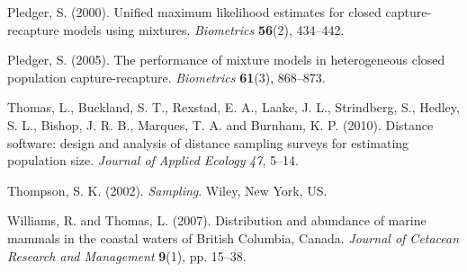 \documentclass[useAMS,referee]{biom}
\begin{document}
\begin{thebibliography}{}
\bibitem{ } Pledger, S. (2000). Unified maximum likelihood estimates for closed capture-recapture models using mixtures. \textit{Biometrics} \textbf{56}(2), 434--442. 

\bibitem{ } Pledger, S. (2005). The performance of mixture models in heterogeneous closed population capture-recapture. \textit{Biometrics} \textbf{61}(3), 868--873.

\bibitem{ } Thomas, L., Buckland, S. T., Rexstad, E. A., Laake, J. L., Strindberg, S., Hedley, S. L., Bishop, J. R. B., Marques, T. A. and Burnham, K. P. (2010). Distance software: design and analysis of distance sampling surveys for estimating population size. \textit{Journal of Applied Ecology} \textit{47}, 5--14.

\bibitem{ } Thompson, S. K. (2002). \textit{Sampling}. Wiley, New York, US.

\bibitem{ } Williams, R. and Thomas, L. (2007). Distribution and abundance of marine mammals in the coastal waters of British Columbia, Canada. \textit{Journal of Cetacean Research and Management} \textbf{9}(1), pp. 15--38.

\end{thebibliography}

\label{lastpage}
\end{document}
